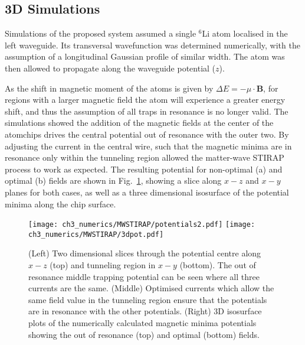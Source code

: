 \subsection{3D Simulations}
\label{sec:Results}

Simulations of the proposed system assumed a single $^{6}$Li atom localised in the left waveguide. Its transversal wavefunction was determined numerically, with the assumption of a longitudinal Gaussian profile of similar width. The atom was then allowed to propagate along the waveguide potential ($z$).

As the shift in magnetic moment of the atoms is given by $\Delta E = -\mu\cdot\mathbf{B}$, for regions with a larger magnetic field the atom will experience a greater energy shift, and thus the assumption of all traps in resonance is no longer valid. The simulations showed the addition of the magnetic fields at the center of the atomchips drives the central potential out of resonance with the outer two. By adjusting the current in the central wire, such that the magnetic minima are in resonance only within the tunneling region allowed the matter-wave STIRAP process to work as expected. The resulting potential for non-optimal (a) and optimal (b) fields are shown in Fig.~\ref{fig:equaloptcurrent}, showing a slice along $x-z$ and $x-y$ planes for both cases, as well as a three dimensional isosurface of the potential minima along the chip surface.

\iffalse
\begin{figure}[tb]
    \centering
  \texttt{[image: ch3\_numerics/MWSTIRAP/3dpot.pdf]}
  \caption[Simulated 3D potentials for the atomchip device]{3D isosurface plots of the magnetic minima potentials are given for two separate cases of the atomchip: a) display the potentials assuming a constant and equal current through all wires; b) shows optimised currents through the wires, ensuring minimal distortion of the central tunneling region. Copyright PRA...}
  \label{fig:mag_min_3d}
\end{figure}
\fi


\begin{figure}[tb]
    \centering
  \texttt{[image: ch3\_numerics/MWSTIRAP/potentials2.pdf]}
  \texttt{[image: ch3\_numerics/MWSTIRAP/3dpot.pdf]}
  \caption{(Left) Two dimensional slices through the potential centre along $x-z$ (top) and tunneling region in $x-y$ (bottom). The out of resonance middle trapping potential can be seen where all three currents are the same. (Middle) Optimised currents which allow the same field value in the tunneling region ensure that the potentials are in resonance with the other potentials. (Right) 3D isosurface plots of the numerically calculated magnetic minima potentials showing the out of resonance (top) and optimal (bottom) fields.}
  \label{fig:equaloptcurrent}
\end{figure}


